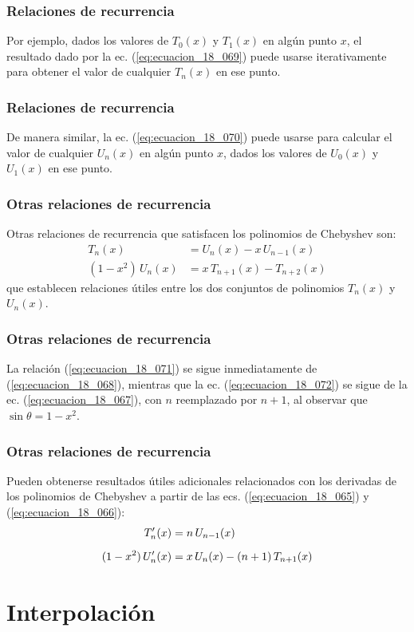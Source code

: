 \documentclass[12pt]{beamer}
\begin{document}
\begin{frame}
\frametitle{Relaciones de recurrencia}
Por ejemplo, dados los valores de $T_{0} (x)$ y $T_{1} (x)$ en algún punto $x$, el resultado dado por la ec. (\ref{eq:ecuacion_18_069}) puede usarse iterativamente para obtener el valor de cualquier $T_{n} (x)$ en ese punto.
\end{frame}
\begin{frame}
\frametitle{Relaciones de recurrencia}
De manera similar, la ec. (\ref{eq:ecuacion_18_070}) puede usarse para calcular el valor de cualquier $U_{n} (x)$ en algún punto $x$, dados los valores de $U_{0} (x)$ y $U_{1} (x)$ en ese punto.
\end{frame}
\begin{frame}
\frametitle{Otras relaciones de recurrencia}
Otras relaciones de recurrencia que satisfacen los polinomios de Chebyshev son:
\pause
\begin{align}
T_{n} (x) &= U_{n}(x) - x \, U_{n-1} (x) \label{eq:ecuacion_18_071} \\[0.5em]
(1 - x^{2}) \, U_{n} (x) &= x \, T_{n+1} (x) - T_{n+2} (x) \label{eq:ecuacion_18_072}
\end{align}
que establecen relaciones útiles entre los dos conjuntos de polinomios $T_{n} (x)$ y $U_{n} (x)$.
\end{frame}
\begin{frame}
\frametitle{Otras relaciones de recurrencia}
La relación (\ref{eq:ecuacion_18_071}) se sigue inmediatamente de (\ref{eq:ecuacion_18_068}), mientras que la ec. (\ref{eq:ecuacion_18_072}) se sigue de la ec. (\ref{eq:ecuacion_18_067}), con $n$ reemplazado por $n + 1$, al observar que $\sin \theta = 1 - x^{2}$.
\end{frame}
\begin{frame}
\frametitle{Otras relaciones de recurrencia}
Pueden obtenerse resultados útiles adicionales relacionados con los derivadas de los polinomios de Chebyshev a partir de las ecs. (\ref{eq:ecuacion_18_065}) y (\ref{eq:ecuacion_18_066}):
\pause
\begin{align*}
{T}^{\prime}_{n} (x) &= n \, U_{n-1} (x) \\[0.5em]
(1 - x^{2}) \, {U}^{\prime}_{n} (x) &= x \, U_{n} (x) - (n + 1) \, T_{n+1} (x)
\end{align*}
\end{frame}

\section{Interpolación}
\end{document}
